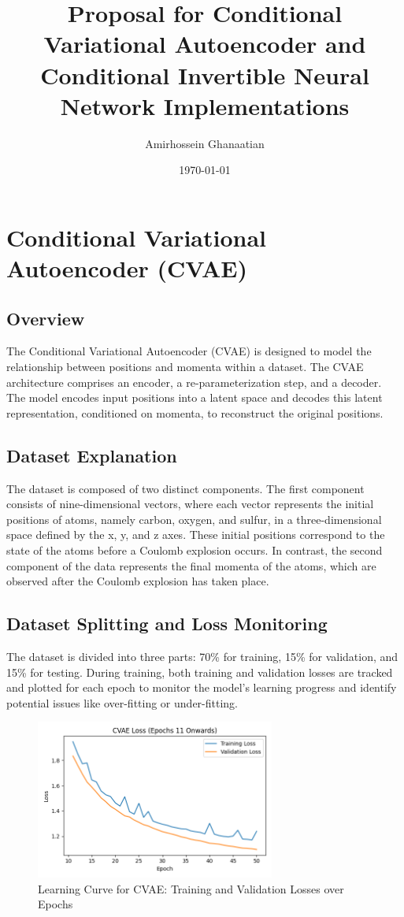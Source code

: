 \documentclass[11pt]{paper}
\title{Proposal for Conditional Variational Autoencoder and Conditional Invertible Neural Network Implementations}
\author{Amirhossein Ghanaatian}
\date{\today}
\begin{document}
\maketitle

\section{Conditional Variational Autoencoder (CVAE)}

\subsection{Overview}
The Conditional Variational Autoencoder (CVAE) is designed to model the relationship between positions and momenta within a dataset. The CVAE architecture comprises an encoder, a re-parameterization step, and a decoder. The model encodes input positions into a latent space and decodes this latent representation, conditioned on momenta, to reconstruct the original positions.

\subsection{Dataset Explanation}
\label{subsec:Explanation}
The dataset is composed of two distinct components. The first component consists of nine-dimensional vectors, where each vector represents the initial positions of atoms, namely carbon, oxygen, and sulfur, in a three-dimensional space defined by the x, y, and z axes. These initial positions correspond to the state of the atoms before a Coulomb explosion occurs.
In contrast, the second component of the data represents the final momenta of the atoms, which are observed after the Coulomb explosion has taken place.

\subsection{Dataset Splitting and Loss Monitoring}
\label{subsec:Splitting}
The dataset is divided into three parts: 70\% for training, 15\% for validation, and 15\% for testing. During training, both training and validation losses are tracked and plotted for each epoch to monitor the model’s learning progress and identify potential issues like over-fitting or under-fitting.

\begin{figure}[H]
    \centering
    \includegraphics[width=0.7\textwidth]{cvae_lc.png}
    \caption{Learning Curve for CVAE: Training and Validation Losses over Epochs}
    \label{fig:cvae_lc}
\end{figure}
\end{document}
